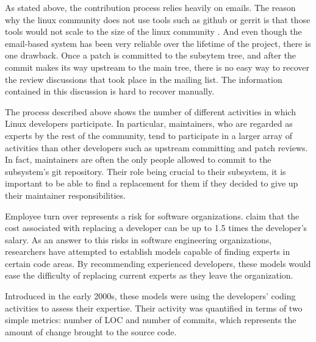 As stated above, the contribution process relies heavily on emails. The reason why the linux community does not use tools such as github or gerrit is that those tools would not scale to the size of the linux community \citep{armstrong}. And even though the email-based system has been very reliable over the lifetime of the project, there is one drawback. Once a patch is committed to the subsytem tree, and after the commit makes its way upstream to the main tree, there is no easy way to recover the review discussions that took place in the mailing list. The information contained in this discussion is hard to recover manually. 

The process described above shows the number of different activities in which Linux developers participate. In particular, maintainers, who are regarded as experts by the rest of the community, tend to participate in a larger array of activities than other developers such as upstream committing and patch reviews. In fact, maintainers are often the only people allowed to commit to the subsystem's git repository. Their role being crucial to their subsystem, it is important to be able to find a replacement for them if they decided to give up their maintainer responsibilities.










Employee turn over represents a risk for software organizations. \citep{turnover} claim that the cost associated with replacing a developer can be up to 1.5 times the developer's salary. As an answer to this risks in software engineering organizations, researchers have attempted to establish models capable of finding experts in certain code areas. By recommending experienced developers, these models would ease the difficulty of replacing current experts as they leave the organization. 


Introduced in the early 2000s\citep{mockus02}\citep{McDonald}, these models were using the developers' coding activities to assess their expertise. Their activity was quantified in terms of two simple metrics: number of \ac{LOC} and number of commits, which represents the amount of change brought to the source code. 

